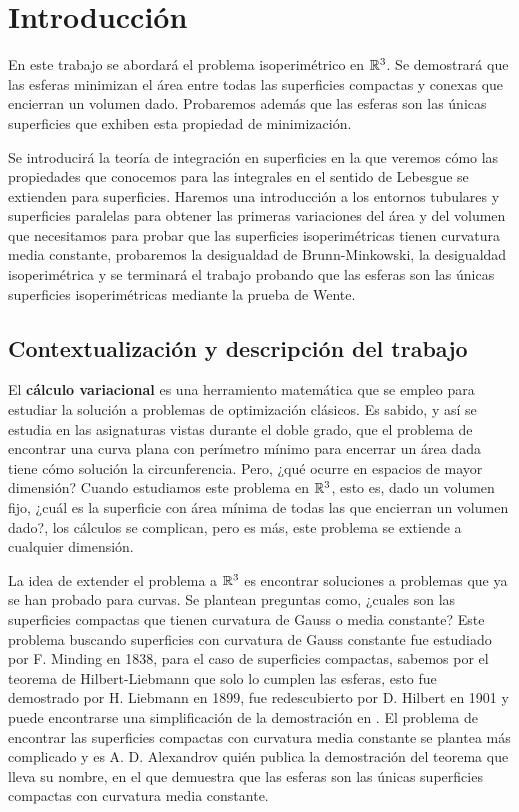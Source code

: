 \section{Introducción}

En este trabajo se abordará el problema isoperimétrico en $\mathbb{R}^3$. Se demostrará que las esferas minimizan el área entre todas las superficies compactas y conexas que encierran un volumen dado. Probaremos además que las esferas son las únicas superficies que exhiben esta propiedad de minimización.

Se introducirá la teoría de integración en superficies en la que veremos cómo las propiedades que conocemos para las integrales en el sentido de Lebesgue se extienden para superficies. Haremos una introducción a los entornos tubulares y superficies paralelas para obtener las primeras variaciones del área y del volumen que necesitamos para probar que las superficies isoperimétricas tienen curvatura media constante, probaremos la desigualdad de Brunn-Minkowski, la desigualdad isoperimétrica y se terminará el trabajo probando que las esferas son las únicas superficies isoperimétricas mediante la prueba de Wente.

\subsection{Contextualización y descripción del trabajo}

El \textbf{cálculo variacional} es una herramiento matemática que se empleo para estudiar la solución a problemas de optimización clásicos. Es sabido, y así se estudia en las asignaturas vistas durante el doble grado, que el problema de encontrar una curva plana con perímetro mínimo para encerrar un área dada tiene cómo solución la circunferencia. Pero, ¿qué ocurre en espacios de mayor dimensión? Cuando estudiamos este problema en $\mathbb{R}^3$, esto es, dado un volumen fijo, ¿cuál es la superficie con área mínima de todas las que encierran un volumen dado?, los cálculos se complican, pero es más, este problema se extiende a cualquier dimensión.

La idea de extender el problema a $\mathbb{R}^3$ es encontrar soluciones a problemas que ya se han probado para curvas. Se plantean preguntas como, ¿cuales son las superficies compactas que tienen curvatura de Gauss o media constante? Este problema buscando superficies con curvatura de Gauss constante fue estudiado por F. Minding en 1838, para el caso de superficies compactas, sabemos por el teorema de Hilbert-Liebmann que solo lo cumplen las esferas, esto fue demostrado por H. Liebmann en 1899, fue redescubierto por D. Hilbert en 1901 y puede encontrarse una simplificación de la demostración en \cite{montielrosbook}. El problema de encontrar las superficies compactas con curvatura media constante se plantea más complicado y es A. D. Alexandrov quién publica la demostración del teorema que lleva su nombre, en el que demuestra que las esferas son las únicas superficies compactas con curvatura media constante.


